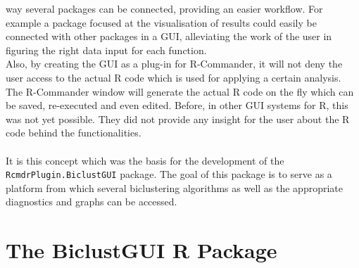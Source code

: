 \documentclass[a4paper]{article}\usepackage[]{graphicx}\usepackage[]{color}
\begin{document}
way several packages can be connected, providing an easier workflow. For
example a package focused at the visualisation of results could easily be
connected with other packages in a GUI, alleviating the work of the user in
figuring the right data input for each function.\\
Also, by creating the GUI as a plug-in for R-Commander, it will not deny the
user access to the actual R code which is used for applying a certain analysis.
The R-Commander window will generate the actual R code on the fly which can be
saved, re-executed and even edited. Before, in other GUI systems for R, this was
not yet possible. They did not provide any insight for the user about the R code
behind the functionalities.
\\ \\
It is this concept which was the basis for the development of the
\verb|RcmdrPlugin.BiclustGUI| package. The goal of this package is to serve
as a platform from which several biclustering algorithms as well as the
appropriate diagnostics and graphs can be accessed.


\newpage
\section{The BiclustGUI R Package}
\end{document}
